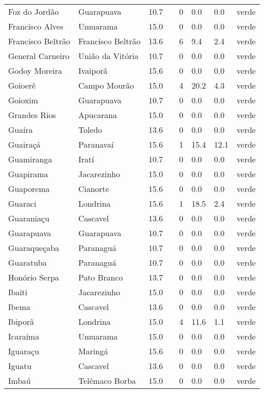 \begin{longtable}{l|lllllll}
  Foz do Jordão & Guarapuava & 10.7 &  & 0 & 0.0 & 0.0 & verde \\ 
  Francisco Alves & Umuarama & 15.0 &  & 0 & 0.0 & 0.0 & verde \\ 
  Francisco Beltrão & Francisco Beltrão & 13.6 &  & 6 & 9.4 & 2.4 & verde \\ 
  General Carneiro & União da Vitória & 10.7 &  & 0 & 0.0 & 0.0 & verde \\ 
  Godoy Moreira & Ivaiporã & 15.6 &  & 0 & 0.0 & 0.0 & verde \\ 
  Goioerê & Campo Mourão & 15.0 &  & 4 & 20.2 & 4.3 & verde \\ 
  Goioxim & Guarapuava & 10.7 &  & 0 & 0.0 & 0.0 & verde \\ 
  Grandes Rios & Apucarana & 15.0 &  & 0 & 0.0 & 0.0 & verde \\ 
  Guaíra & Toledo & 13.6 &  & 0 & 0.0 & 0.0 & verde \\ 
  Guairaçá & Paranavaí & 15.6 &  & 1 & 15.4 & 12.1 & verde \\ 
  Guamiranga & Iratí & 10.7 &  & 0 & 0.0 & 0.0 & verde \\ 
  Guapirama & Jacarezinho & 15.0 &  & 0 & 0.0 & 0.0 & verde \\ 
  Guaporema & Cianorte & 15.6 &  & 0 & 0.0 & 0.0 & verde \\ 
  Guaraci & Londrina & 15.6 &  & 1 & 18.5 & 2.4 & verde \\ 
  Guaraniaçu & Cascavel & 13.6 &  & 0 & 0.0 & 0.0 & verde \\ 
  Guarapuava & Guarapuava & 10.7 &  & 0 & 0.0 & 0.0 & verde \\ 
  Guaraqueçaba & Paranaguá & 10.7 &  & 0 & 0.0 & 0.0 & verde \\ 
  Guaratuba & Paranaguá & 10.7 &  & 0 & 0.0 & 0.0 & verde \\ 
  Honório Serpa & Pato Branco & 13.7 &  & 0 & 0.0 & 0.0 & verde \\ 
  Ibaiti & Jacarezinho & 15.0 &  & 0 & 0.0 & 0.0 & verde \\ 
  Ibema & Cascavel & 13.6 &  & 0 & 0.0 & 0.0 & verde \\ 
  Ibiporã & Londrina & 15.0 &  & 4 & 11.6 & 1.1 & verde \\ 
  Icaraíma & Umuarama & 15.0 &  & 0 & 0.0 & 0.0 & verde \\ 
  Iguaraçu & Maringá & 15.6 &  & 0 & 0.0 & 0.0 & verde \\ 
  Iguatu & Cascavel & 13.6 &  & 0 & 0.0 & 0.0 & verde \\ 
  Imbaú & Telêmaco Borba & 15.0 &  & 0 & 0.0 & 0.0 & verde \\ 

\end{longtable}
